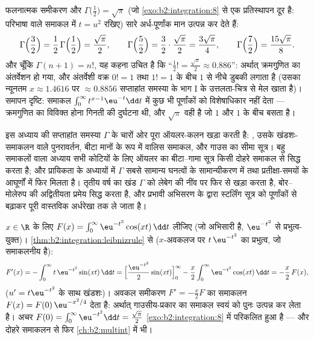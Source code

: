 \begin{example}[अर्ध-पूर्णांक क्रमगुणित]\label{ex:b2:integration:halffactorial}
फलनात्मक समीकरण और $\Gamma\bigl(\frac12\bigr) =
\sqrt\pi$ (जो \cref{exo:b2:integration:8} से एक प्रतिस्थापन दूर है: परिभाषा वाले
समाकल में $t = u^2$ रखिए) सारे अर्ध-पूर्णांक मान उत्पन्न कर देते हैं:
\[
\Gamma\Bigl(\frac32\Bigr) = \frac12\,\Gamma\Bigl(\frac12\Bigr)
= \frac{\sqrt\pi}{2},
\qquad
\Gamma\Bigl(\frac52\Bigr) = \frac32\cdot\frac{\sqrt\pi}{2}
= \frac{3\sqrt\pi}{4},
\qquad
\Gamma\Bigl(\frac72\Bigr) = \frac{15\sqrt\pi}{8} .
\]
और चूँकि $\Gamma(n+1) = n!$, यह कहना उचित है कि ``$\frac12! =
\frac{\sqrt\pi}{2} \approx 0.886$'': अर्थात् क्रमगुणित का
अंतर्वेशन हो गया, और अंतर्वेशी वक्र $0! = 1$ तथा $1! = 1$ के बीच $1$ से नीचे डुबकी
लगाता है (उसका न्यूनतम $x \approx 1.4616$ पर $\approx 0.8856$ सप्ताहांत समस्या के भाग I के
उत्तलता-चित्र से मेल खाता है)। समापन दृष्टि: समाकल $\int_0^\infty t^{x-1}\eu^{-t}\dd t$ में कुछ भी
पूर्णांकों को विशेषाधिकार नहीं देता --- क्रमगुणित का विविक्त होना गिनती
की दुर्घटना थी, और $\sqrt\pi$ वही है जो $1$ और $1$ के बीच बसता है।
\end{example}

\begin{remark}[$\Gamma$ यहाँ से कहाँ जाता है]
इस अध्याय की सप्ताहांत समस्या $\Gamma$ के चारों ओर पूरा ऑयलर-कलन खड़ा करती है:
, उसके खंडशः-समाकलन वाले पुनरावर्तन, बीटा मानों के रूप में वालिस
समाकल, और गाउस का सीमा सूत्र। बहु समाकलों वाला अध्याय सभी कोटियों के लिए
ऑयलर का बीटा--गामा सूत्र किसी दोहरे समाकल से सिद्ध करता है; और प्रायिकता
के अध्यायों में $\Gamma$ सबसे सामान्य घनत्वों के सामान्यीकरण में तथा
प्रतीक्षा-समयों के आघूर्णों में फिर मिलता है। तृतीय वर्ष का खंड $\Gamma$ को
लेबेग की नींव पर फिर से खड़ा करता है, बोर--मोलेरुप की अद्वितीयता प्रमेय
सिद्ध करता है, और प्रभावी अभिसरण के द्वारा स्टर्लिंग सूत्र को पूर्णांकों
से बढ़ाकर पूरी वास्तविक अर्धरेखा तक ले जाता है।
\end{remark}

\begin{example}\label{ex:b2:integration:laplace}
$x \in \R$ के लिए $F(x) = \int_0^{\infty} \eu^{-t^2}\cos(xt)\,\dd
t$ लीजिए (जो  अभिसारी है, $\eu^{-t^2}$ से
प्रभुत्व-युक्त)। \cref{thm:b2:integration:leibnizrule} से ($x$-अवकलज पर $t\,\eu^{-t^2}$ का प्रभुत्व, जो समाकलनीय है):
\[
F'(x) = -\int_0^\infty t\,\eu^{-t^2}\sin(xt)\,\dd t
= \Bigl[\frac{\eu^{-t^2}}{2}\sin(xt)\Bigr]_0^\infty
- \frac x2\int_0^\infty \eu^{-t^2}\cos(xt)\,\dd t
= -\frac x2\,F(x),
\]
($u' = t\eu^{-t^2}$ के साथ खंडशः)। अवकल समीकरण $F' =
-\frac x2 F$ का समाकलन $F(x) = F(0)\,\eu^{-x^2/4}$ देता है: अर्थात्
गाउसीय-प्रकार का समाकल स्वयं को पुनः उत्पन्न कर लेता है। अचर $F(0) =
\int_0^\infty \eu^{-t^2}\dd t = \frac{\sqrt\pi}{2}$ \cref{exo:b2:integration:8}
में परिकलित हुआ है --- और दोहरे समाकलन से फिर \cref{ch:b2:multint} में भी।
\end{example}

